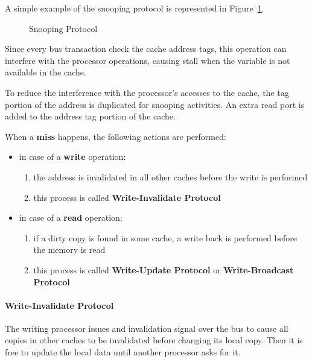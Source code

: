 \documentclass[english]{article}
\begin{document}
A simple example of the snooping protocol is represented in Figure~\ref{fig:snooping-protocol}.

\begin{figure}[htbp]
  \bigskip
  \centering
  \caption{Snooping Protocol}
  \label{fig:snooping-protocol}
  \bigskip
\end{figure}

\bigskip
Since every bus transaction check the cache address tags, this operation can interfere with the processor operations, causing stall when the variable is not available in the cache.

To reduce the interference with the processor's accesses to the cache, the tag portion of the address is duplicated for snooping activities.
An extra read port is added to the address tag portion of the cache.

\bigskip
When a \textbf{miss} happens, the following actions are performed:

\begin{itemize}
  \item in case of a \textbf{write} operation:
        \begin{enumerate}
          \item the address is invalidated in all other caches before the write is performed
          \item this process is called \textbf{Write-Invalidate Protocol}
        \end{enumerate}
  \item in case of a \textbf{read} operation:
        \begin{enumerate}
          \item if a dirty copy is found in some cache, a write back is performed before the memory is read
          \item this process is called \textbf{Write-Update Protocol} or \textbf{Write-Broadcast Protocol}
        \end{enumerate}
\end{itemize}

\paragraph{Write-Invalidate Protocol}

The writing processor issues and invalidation signal over the bus to cause all copies in other caches to be invalidated before changing its local copy.
Then it is free to update the local data until another processor asks for it.
\end{document}
